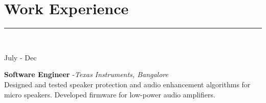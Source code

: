 \documentclass[10pt]{article}
\newcommand\vtick{\textquotesingle}
\begin{document}



\section*{\color{black} Work Experience}

\noindent\textcolor{black}{\rule{\textwidth}{1pt}} \vspace{-0.2cm}\\
\begin{minipage}[t]{.2\textwidth}
July\vtick19 - Dec\vtick20
\end{minipage}
\begin{minipage}[t]{0.8\textwidth}
{\bf Software Engineer }-{\it Texas Instruments, Bangalore}\\
Designed and tested speaker protection and audio enhancement algorithms for micro speakers. Developed firmware for low-power audio amplifiers.
\end{minipage}
\end{document}
